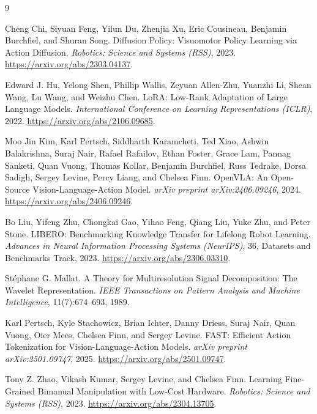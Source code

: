 \documentclass[10pt]{article}
\begin{document}
\clearpage

\begin{thebibliography}{9}

Cheng Chi, Siyuan Feng, Yilun Du, Zhenjia Xu, Eric Cousineau, Benjamin Burchfiel, and Shuran Song.
Diffusion Policy: Visuomotor Policy Learning via Action Diffusion.
\emph{Robotics: Science and Systems (RSS)}, 2023.
\url{https://arxiv.org/abs/2303.04137}.

Edward J. Hu, Yelong Shen, Phillip Wallis, Zeyuan Allen-Zhu, Yuanzhi Li, Shean Wang, Lu Wang, and Weizhu Chen.
LoRA: Low-Rank Adaptation of Large Language Models.
\emph{International Conference on Learning Representations (ICLR)}, 2022.
\url{https://arxiv.org/abs/2106.09685}.

Moo Jin Kim, Karl Pertsch, Siddharth Karamcheti, Ted Xiao, Ashwin Balakrishna, Suraj Nair, Rafael Rafailov, Ethan Foster, Grace Lam, Pannag Sanketi, Quan Vuong, Thomas Kollar, Benjamin Burchfiel, Russ Tedrake, Dorsa Sadigh, Sergey Levine, Percy Liang, and Chelsea Finn.
OpenVLA: An Open-Source Vision-Language-Action Model.
\emph{arXiv preprint arXiv:2406.09246}, 2024.
\url{https://arxiv.org/abs/2406.09246}.

Bo Liu, Yifeng Zhu, Chongkai Gao, Yihao Feng, Qiang Liu, Yuke Zhu, and Peter Stone.
LIBERO: Benchmarking Knowledge Transfer for Lifelong Robot Learning.
\emph{Advances in Neural Information Processing Systems (NeurIPS)}, 36, Datasets and Benchmarks Track, 2023.
\url{https://arxiv.org/abs/2306.03310}.

St\'ephane G. Mallat.
A Theory for Multiresolution Signal Decomposition: The Wavelet Representation.
\emph{IEEE Transactions on Pattern Analysis and Machine Intelligence}, 11(7):674--693, 1989.

Karl Pertsch, Kyle Stachowicz, Brian Ichter, Danny Driess, Suraj Nair, Quan Vuong, Oier Mees, Chelsea Finn, and Sergey Levine.
FAST: Efficient Action Tokenization for Vision-Language-Action Models.
\emph{arXiv preprint arXiv:2501.09747}, 2025.
\url{https://arxiv.org/abs/2501.09747}.

Tony Z. Zhao, Vikash Kumar, Sergey Levine, and Chelsea Finn.
Learning Fine-Grained Bimanual Manipulation with Low-Cost Hardware.
\emph{Robotics: Science and Systems (RSS)}, 2023.
\url{https://arxiv.org/abs/2304.13705}.

\end{thebibliography}
\end{document}
